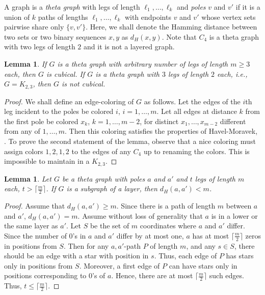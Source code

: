 \documentclass[11pt, a4paper]{article}
\newtheorem{lemma}[theorem]{Lemma}
\begin{document}
	A graph is a {\it theta graph}  with legs of length $\ell_1, \ldots, \ell_k$  and {\it poles} $v$ and $v'$   if it is a union of $k$ paths of lengths $\ell_1, \ldots, \ell_k$  with endpoints $v$ and $v'$  whose vertex sets pairwise share only $\{v, v'\}$. Here, we shall denote the Hamming distance between two sets or two binary sequences  $x,y$ as $d_H(x,y)$. 
	Note that $C_4$  is a theta graph with two legs of length $2$ and it is not a layered graph.
	
	
	\begin{lemma}
		If  $G$ is a theta graph with arbitrary number of legs of length $m\geq 3$ each, then $G$ is cubical.
		If $G$ is a theta graph with $3$ legs of length $2$ each, i.e., $G=K_{2,3}$, then $G$ is not cubical.
		\end{lemma}
	
	\begin{proof}
	We shall define an edge-coloring of $G$ as follows. 
	Let the edges of the $i$th  leg  incident to the poles be colored $i$, $i=1, \ldots, m$. 
	Let  all edges at distance $k$ from the first pole be colored $x_k$,  $k=1, \ldots, m-2$, for distinct $x_1, \ldots, x_{m-2}$
	different from any of $1, \ldots, m$.
Then this coloring satisfies the 	properties of Havel-Moravek, \cite{HM}.
To prove the second statement of the lemma, observe that a nice coloring must assign colors $1, 2, 1, 2$ to the edges of any $C_4$ up to renaming the colors. This is impossible to maintain in a $K_{2,3}$.
 \end{proof}

	 	\begin{lemma}\label{theta-symmetric}
	Let $G$ be a theta graph with poles $a$ and $a'$ and $t$ legs of length $m$ each, $t>\lceil \frac{m}{2} \rceil$.  If $G$ is a subgraph of a layer, then  $d_H(a, a')<m$. 
\end{lemma}
	 
	 \begin{proof}
	 Assume that $d_H(a, a')\geq m$. Since there is a path of length $m$ between $a$ and $a'$, $d_H(a, a')=m$.
	 Assume without loss of generality that $a$ is in a lower or the same layer as $a'$.
	 Let $S$ be the set of $m$ coordinates where $a$ and $a'$ differ. Since the number of $0$'s in $a$ and $a'$ differ by at most one,  $a$ has at most $\lceil \frac{m}{2} \rceil$ zeros in positions from $S$.
	 Then for  any $a, a'$-path $P$ of length $m$, and any $s\in S$,  there should be an edge with a star with position in $s$.
	 Thus, each edge  of $P$ has stars only in positions from $S$. 
	 Moreover, a first edge of $P$ can have stars only in positions corresponding to $0$'s of $a$. Hence,
	 there are at most $\lceil \frac{m}{2} \rceil$ such edges. Thus, $t\leq \lceil \frac{m}{2} \rceil$.
		 \end{proof}
	
\end{document}

